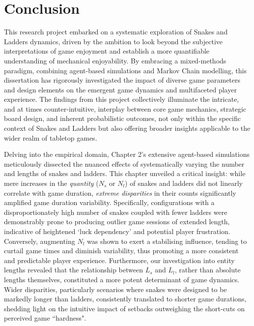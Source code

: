 \chapter{Conclusion}
This research project embarked on a systematic exploration of Snakes and Ladders dynamics, driven by the ambition to look beyond the subjective interpretations of game enjoyment and establish a more quantifiable understanding of mechanical enjoyability.  By embracing a mixed-methods paradigm, combining agent-based simulations and Markov Chain modelling, this dissertation has rigorously investigated the impact of diverse game parameters and design elements on the emergent game dynamics and multifaceted player experience. The findings from this project collectively illuminate the intricate, and at times counter-intuitive, interplay between core game mechanics, strategic board design, and inherent probabilistic outcomes, not only within the specific context of Snakes and Ladders but also offering broader insights applicable to the wider realm of tabletop games.

Delving into the empirical domain, Chapter 2’s extensive agent-based simulations meticulously dissected the nuanced effects of systematically varying the number and lengths of snakes and ladders.  This chapter unveiled a critical insight: while mere increases in the \textit{quantity} ($N_s$ or $N_l$) of snakes and ladders did not linearly correlate with game duration, \textit{extreme disparities} in their counts significantly amplified game duration variability.  Specifically, configurations with a disproportionately high number of snakes coupled with fewer ladders were demonstrably prone to producing outlier game sessions of extended length, indicative of heightened ‘luck dependency’ and potential player frustration. Conversely, augmenting $N_l$ was shown to exert a stabilising influence, tending to curtail game times and diminish variability, thus promoting a more consistent and predictable player experience.  Furthermore, our investigation into entity lengths revealed that the relationship between $L_s$ and $L_l$, rather than absolute lengths themselves, constituted a more potent determinant of game dynamics. Wider disparities, particularly scenarios where snakes were designed to be markedly longer than ladders, consistently translated to shorter game durations, shedding light on the intuitive impact of setbacks outweighing the short-cuts on perceived game ``hardness".

